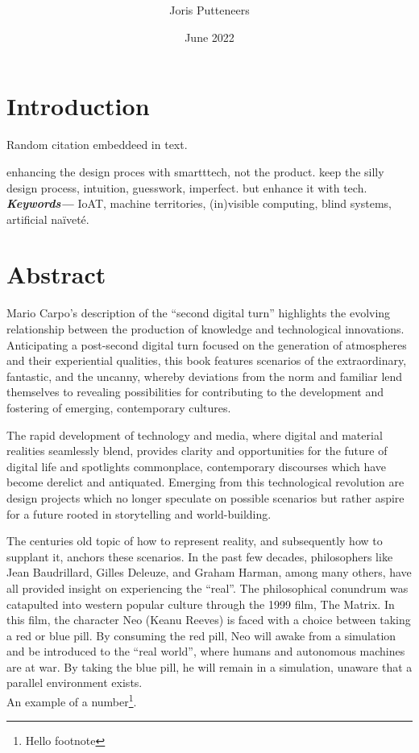 \documentclass{article}
\title{\textbf{\xs}}
\author{Joris Putteneers}
\date{June 2022}
\newcommand\z{black} %
\newcommand\w{blue} %
\providecommand{\keywords}[1]
{
  \small	
  \textbf{\textit{Keywords---}} #1
}
\begin{document}
\color{\z}
\pagecolor{\q}

\pagestyle{plain} %

\maketitle
\tableofcontents

\section*{Introduction}
Random citation \cite{DUMMY:1} embeddeed in text.


enhancing the design proces with smartttech, not the product.
keep the silly design process, intuition, guesswork, imperfect. but enhance it with tech. \\


\keywords{{\color{\w}IoAT, machine territories, (in)visible computing, blind systems, artificial naïveté.}}

\section{Abstract}
Mario Carpo's description of the “second digital turn” highlights the evolving relationship between the production of knowledge and technological innovations. Anticipating a post-second digital turn focused on the generation of atmospheres and their experiential qualities, this book features scenarios of the extraordinary, fantastic, and the uncanny, whereby deviations from the norm and familiar lend themselves to revealing possibilities for contributing to the development and fostering of emerging, contemporary cultures.



The rapid development of technology and media, where digital and material realities seamlessly blend, provides clarity and opportunities for the future of digital life and spotlights commonplace, contemporary discourses which have become derelict and antiquated. Emerging from this technological revolution are design projects which no longer speculate on possible scenarios but rather aspire for a future rooted in storytelling and world-building. 


The centuries old topic of how to represent reality, and subsequently how to supplant it, anchors these scenarios. In the past few decades, philosophers like Jean Baudrillard, Gilles Deleuze, and Graham Harman, among many others, have all provided insight on experiencing the “real”. The philosophical conundrum was catapulted into western popular culture through the 1999 film, The Matrix. In this film, the character Neo (Keanu Reeves) is faced with a choice between taking a red or blue pill. By consuming the red pill, Neo will awake from a simulation and be introduced to the “real world”, where humans and autonomous machines are at war. By taking the blue pill, he will remain in a simulation, unaware that a parallel environment exists. \\
An example of a number\footnote{\label{myfootnote}Hello footnote}.
\end{document}
